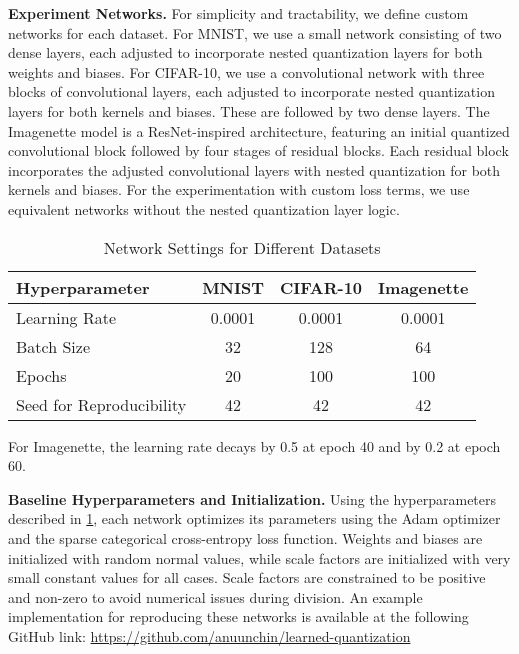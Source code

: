 \textbf{Experiment Networks.} 
For simplicity and tractability, we define custom networks for each dataset.
For MNIST, we use a small network consisting of two dense layers, 
each adjusted to incorporate nested quantization layers for both weights and biases. 
For CIFAR-10, we use a convolutional network with three blocks of convolutional layers, 
each adjusted to incorporate nested quantization layers for both kernels and biases.
These are followed by two dense layers.
The Imagenette model is a ResNet-inspired architecture,
featuring an initial quantized convolutional block followed by four stages of residual blocks. 
Each residual block incorporates the adjusted convolutional layers with nested quantization 
for both kernels and biases. For the experimentation with custom loss terms, 
we use equivalent networks without the nested quantization layer logic.
\begin{table}[b!]
  \centering
  \caption{Network Settings for Different Datasets}
  \label{tab:hyperparameters}
  \begin{tabular}{lccc}
      \toprule
      \textbf{Hyperparameter}     & \textbf{MNIST} & \textbf{CIFAR-10} & \textbf{Imagenette} \\ 
      \midrule
      Learning Rate               & 0.0001            & 0.0001              & 0.0001\footnotemark[1]           \\ 
      Batch Size                  & 32                & 128                 & 64                 \\ 
      Epochs                      & 20               & 100                 & 100                \\ 
      Seed for Reproducibility   & 42               & 42                  & 42                \\ 
      \bottomrule
  \end{tabular}
  \vspace{1.0em}
  \begin{center}
    \parbox{0.86\textwidth}{\footnotesize\footnotemark[1] For Imagenette, the learning rate decays by 0.5 at epoch 40 and by 0.2 at epoch 60.}
  \end{center}
\end{table}


\textbf{Baseline Hyperparameters and Initialization.} Using the hyperparameters described in \cref{tab:hyperparameters}, 
each network optimizes its parameters using the Adam optimizer and the sparse categorical cross-entropy loss function. 
Weights and biases are initialized with random normal values, 
while scale factors are initialized with very small constant values for all cases. 
Scale factors are constrained to be positive and non-zero to avoid numerical issues during division. 
An example implementation for reproducing these networks is available at the following GitHub link: \url{https://github.com/anuunchin/learned-quantization}


